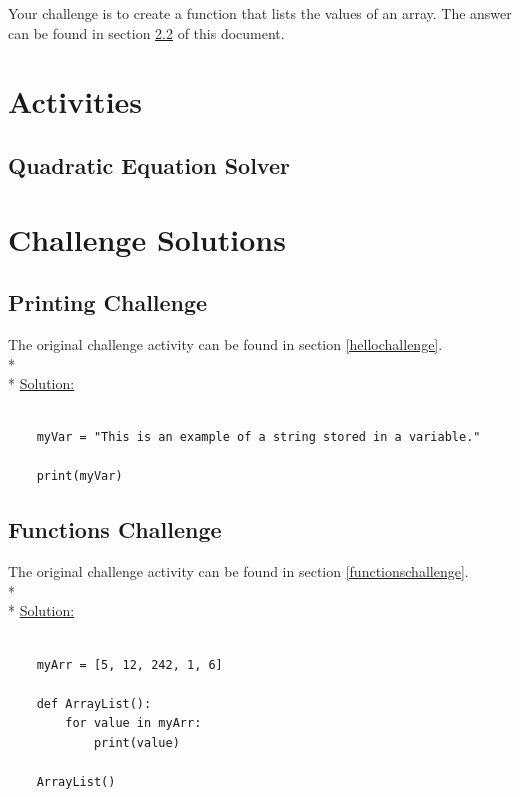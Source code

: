\documentclass[12pt, letterpaper]{article}
\begin{document}
    Your challenge is to create a function that lists the values of an array. The answer can be found in section \ref{functionsol} of this document.


    \section{Activities} \label{activities}

    \subsection{Quadratic Equation Solver} \label{quadsolver}
    
    \section{Challenge Solutions} \label{solutions}

    \subsection{Printing Challenge} \label{hellosol}
    The original challenge activity can be found in section \ref{hellochallenge}. \\*\\*
    \underline{Solution:}

    \begin{verbatim}
    
    myVar = "This is an example of a string stored in a variable."

    print(myVar)

    \end{verbatim}

    \subsection{Functions Challenge} \label{functionsol}

    The original challenge activity can be found in section \ref{functionschallenge}. \\* \\*
    \underline{Solution:}

    \begin{verbatim}

    myArr = [5, 12, 242, 1, 6]

    def ArrayList():
        for value in myArr:
            print(value)
    
    ArrayList()
    
    \end{verbatim}
\end{document}

